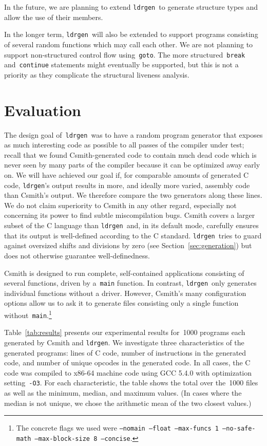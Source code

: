 \documentclass{llncs}
\newcommand\ldrgen{\texttt{ldrgen}}
\begin{document}
In the future, we are planning to extend \ldrgen\ to generate structure
types and allow the use of their members.

In the longer term, \ldrgen\ will also be extended to support programs
consisting of several random functions which may call each other. We are not
planning to support non-structured control flow using~\verb|goto|. The more
structured~\verb|break| and~\verb|continue| statements might eventually be
supported, but this is not a priority as they complicate the structural
liveness analysis.


\section{Evaluation}
\label{sec:evaluation}

The design goal of~\ldrgen\ was to have a random program generator that
exposes as much interesting code as possible to all passes of the compiler
under test; recall that we found Csmith-generated code to contain much dead
code which is never seen by many parts of the compiler because it can be
optimized away early on. We will have achieved our goal if, for comparable
amounts of generated C code, \ldrgen's output results in more, and ideally
more varied, assembly code than Csmith's output. We therefore compare the
two generators along these lines. We do not claim superiority to Csmith in
any other regard, especially not concerning its power to find subtle
miscompilation bugs. Csmith covers a larger subset of the C language than
\ldrgen\ and, in its default mode, carefully ensures that its output is
well-defined according to the C standard. \ldrgen\ tries to guard against
oversized shifts and divisions by zero (see Section~\ref{sec:generation})
but does not otherwise guarantee well-definedness.

Csmith is designed to run complete, self-contained applications consisting
of several functions, driven by a~\verb|main| function. In contrast,
\ldrgen\ only generates individual functions without a driver. However,
Csmith's many configuration options allow us to ask it to generate files
consisting only a single function without~\verb|main|.\footnote{The concrete
flags we used were \texttt{--nomain --float --max-funcs 1 --no-safe-math
--max-block-size 8 --concise}.}

Table~\ref{tab:results} presents our experimental results for~1000 programs
each generated by Csmith and \ldrgen. We investigate three characteristics
of the generated programs: lines of C code, number of instructions in the
generated code, and number of unique opcodes in the generated code. In all
cases, the C code was compiled to x86-64 machine code using GCC 5.4.0 with
optimization setting~\verb|-O3|. For each characteristic, the table shows
the total over the~1000 files as well as the minimum, median, and maximum
values. (In cases where the median is not unique, we chose the arithmetic
mean of the two closest values.)
\end{document}
